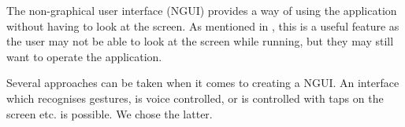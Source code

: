 The non-graphical user interface (NGUI) provides a way of using the application without having to look at the screen. As mentioned in , this is a useful feature as the user may not be able to look at the screen while running, but they may still want to operate the application.

Several approaches can be taken when it comes to creating a NGUI. An interface which recognises gestures, is voice controlled, or is controlled with taps on the screen etc. is possible. We chose the latter.
